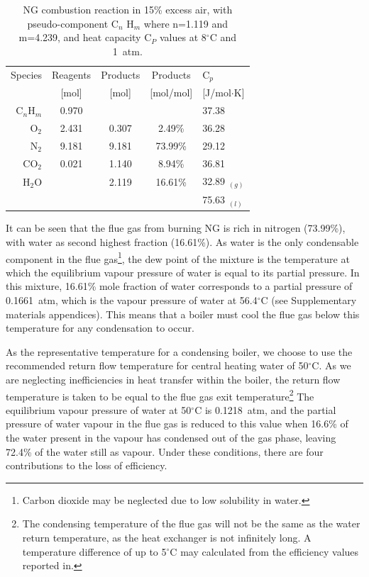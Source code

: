 \documentclass[5p]{elsarticle} %
\begin{document}
\begin{small}
\begin{table}[ht]
    \centering
    \begin{tabular}{r|ccc|l}
         Species & Reagents & Products & Products & C$_p$ \\
         & {\small[mol]} & {\small[mol]} & {\small[mol/mol]} & {\small[J/mol$\cdot$K]} \\
         \hline
         C$_{n}$H$_{m}$ & 0.970 & & & 37.38 \\
         O$_2$ & 2.431 & 0.307 & 2.49\% & 36.28 \\
         N$_2$ & 9.181 & 9.181 & 73.99\% & 29.12 \\
         CO$_2$ & 0.021 & 1.140 & 8.94\% & 36.81 \\
         H$_2$O & & 2.119 & 16.61\% & 32.89 $_{(g)}$ \\
          & &  &  & 75.63 $_{(l)}$ \\
    \end{tabular}
    \caption{NG combustion reaction in 15\% excess air, with pseudo-component C$_{n}$ H$_{m}$ where n=1.119 and m=4.239, and heat capacity C$_P$ values\citep{Huber2022} at 8$^\circ$C and 1~atm.}
    \label{tab:NTSgcombustion}
\end{table}
\end{small}

It can be seen that the flue gas from burning NG is rich in nitrogen (73.99\%), with water as second highest fraction (16.61\%).
As water is the only condensable component in the flue gas\footnote{
Carbon dioxide may be neglected due to low solubility in water\citep{Zhao2023}.
}, the dew point of the mixture is the temperature at which the equilibrium vapour pressure of water is equal to its partial pressure\citep{Perry2008}. 
In this mixture, 16.61\% mole fraction of water corresponds to a partial pressure of 0.1661~atm, which is the vapour pressure of water\citep{Perry2008} at 56.4$^{\circ}$C (see 
Supplementary materials appendices).
This means that a boiler must cool the flue gas below this temperature for any condensation to occur. 

As the representative temperature for a condensing boiler, we choose to use the recommended return flow temperature for central heating water of 50$^{\circ}$C\citep{BEIS-Kiwa2021}. 
As we are neglecting inefficiencies in heat transfer within the boiler, the return flow temperature is taken to be equal to the flue gas exit temperature\footnote{
The condensing temperature of the flue gas will not be the same as the water return temperature, as the heat exchanger is not infinitely long. A temperature difference of up to 5$^{\circ}$C may calculated from the efficiency values reported in\citep{saty2018,DESNZ2023b}.}
The equilibrium vapour pressure of water at 50$^{\circ}$C is 0.1218~atm, and the partial pressure of water vapour in the flue gas is reduced to this value when 16.6\% of the water present in the vapour has condensed out of the gas phase, leaving 72.4\% of the water still as vapour.
Under these conditions, there are four contributions to the loss of efficiency.
\end{document}
